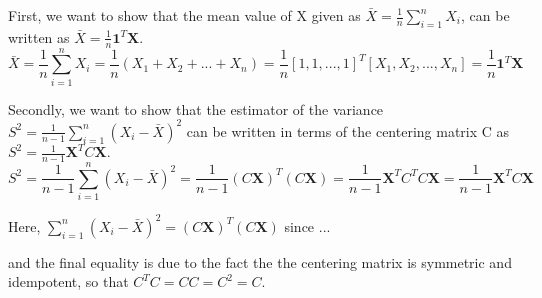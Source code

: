 First, we want to show that the mean value of X given as $\bar X = \frac{1}{n} \sum_{i=1}^{n} X_i$, can be written as $\bar X = \frac{1}{n} \textbf{1}^T \textbf{X}$. 
$$
\bar X = \frac{1}{n} \sum_{i=1}^{n} X_i = \frac{1}{n} (X_1 + X_2 + ... + X_n) = \frac{1}{n} [1, 1, ..., 1]^T [X_1, X_2, ..., X_n]= \frac{1}{n} \textbf{1}^T \textbf{X}
$$

Secondly, we want to show that the estimator of the variance $S^2 = \frac{1}{n-1}  \sum_{i=1}^{n} (X_i - \bar X)^2$ can be written in terms of the centering matrix C as  $S^2 = \frac{1}{n-1} \textbf{X}^T C \textbf{X}.$
$$
S^2 = \frac{1}{n-1}  \sum_{i=1}^{n} (X_i - \bar X)^2 = \frac{1}{n-1} (C\textbf{X})^T (C\textbf{X}) = \frac{1}{n-1} \textbf{X}^T C^T C \textbf{X} =  \frac{1}{n-1} \textbf{X}^T C \textbf{X}
$$

Here, $\sum_{i=1}^{n} (X_i - \bar X)^2 = (C\textbf{X})^T (C\textbf{X})$ since ...

and the final equality is due to the fact the the centering matrix is symmetric and idempotent, so that $C^T C = CC = C^2 = C$.  


